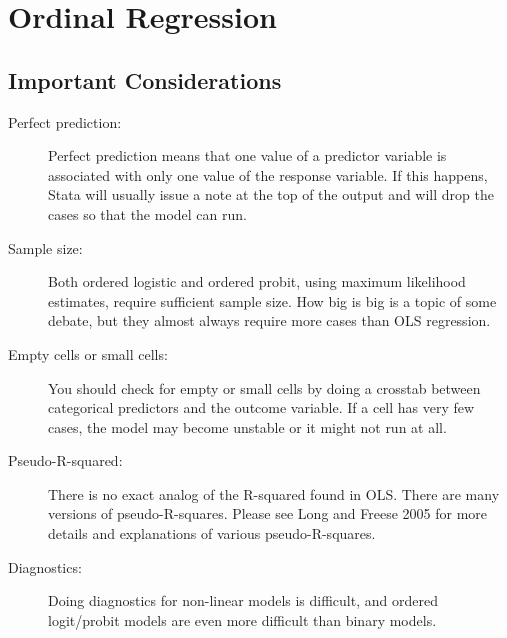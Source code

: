 \documentclass[]{article}
\begin{document}
\section*{Ordinal Regression}

\subsection*{Important Considerations}

\begin{description}
\item[Perfect prediction:] Perfect prediction means that one value of a predictor variable is associated with only one value of the response variable. If this happens, Stata will usually issue a note at the top of the output and will drop the cases so that the model can run.
\item[Sample size:] Both ordered logistic and ordered probit, using maximum likelihood estimates, require sufficient sample size. How big is big is a topic of some debate, but they almost always require more cases than OLS regression.
\item[Empty cells or small cells:] You should check for empty or small cells by doing a crosstab between categorical predictors and the outcome variable. If a cell has very few cases, the model may become unstable or it might not run at all.
\item[Pseudo-R-squared:] There is no exact analog of the R-squared found in OLS. There are many versions of pseudo-R-squares. Please see Long and Freese 2005 for more details and explanations of various pseudo-R-squares.
\item[Diagnostics:] Doing diagnostics for non-linear models is difficult, and ordered logit/probit models are even more difficult than binary models.
\end{description}
\end{document}
